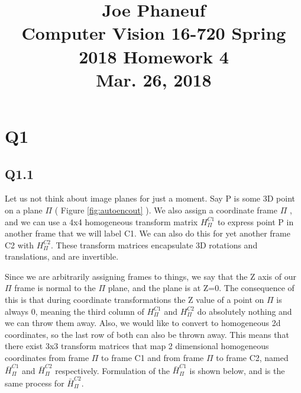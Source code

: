 \documentclass[12pt]{article}
\begin{document}
\title{Joe Phaneuf \\ Computer Vision 16-720 Spring 2018 Homework 4 \\ Mar. 26, 2018 }
\date{}
\author{}
\maketitle

\newpage


\section{Q1}
\subsection{Q1.1}
Let us not think about image planes for just a moment. Say P is some 3D point on a plane $\Pi$ ( Figure \ref{fig:autoencout} ). We also assign a coordinate frame $\Pi$ , and we can use a 4x4 homogeneous transform matrix $H_{\Pi}^{C1}$ to express point P in another frame that we will label C1. We can also do this for yet another frame C2 with $H_{\Pi}^{C2}$. These transform matrices encapsulate 3D rotations and translations, and are invertible. 

Since we are arbitrarily assigning frames to things, we say that the Z axis of our $\Pi$ frame is normal to the $\Pi$ plane, and the plane is at Z=0. The consequence of this is that during coordinate transformations the Z value of a point on $\Pi$ is always 0, meaning the third column of $H_{\Pi}^{C1}$ and $H_{\Pi}^{C2}$ do absolutely nothing and we can throw them away. Also, we would like to convert to homogeneous 2d coordinates, so the last row of both can also be thrown away. This means that there exist 3x3 transform matrices that map 2 dimensional homogeneous coordinates from frame $\Pi$ to frame C1 and from frame $\Pi$ to frame C2, named $\bar{H}_{\Pi}^{C1}$ and $\bar{H}_{\Pi}^{C2}$ respectively. Formulation of the $\bar{H}_{\Pi}^{C1}$ is shown below, and is the same process for $\bar{H}_{\Pi}^{C2}$.
\end{document}
